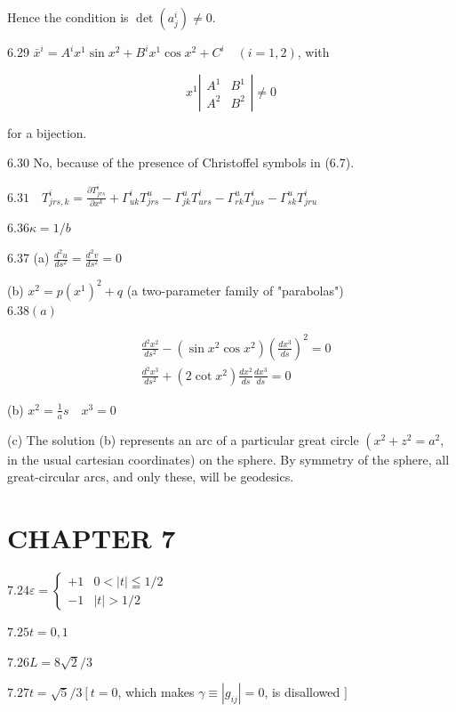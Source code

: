 \documentclass[10pt]{article}
\begin{document}
Hence the condition is $\operatorname{det}\left(a_{j}^{i}\right) \neq 0$.

6.29 $\bar{x}^{i}=A^{i} x^{1} \sin x^{2}+B^{i} x^{1} \cos x^{2}+C^{i} \quad(i=1,2)$, with

$$
x^{1}\left|\begin{array}{ll}
A^{1} & B^{1} \\
A^{2} & B^{2}
\end{array}\right| \neq 0
$$

for a bijection.

6.30 No, because of the presence of Christoffel symbols in (6.7).

$6.31 \quad T_{j r s, k}^{i}=\frac{\partial T_{j r s}^{i}}{\partial x^{k}}+\Gamma_{u k}^{i} T_{j r s}^{u}-\Gamma_{j k}^{u} T_{u r s}^{i}-\Gamma_{r k}^{u} T_{j u s}^{i}-\Gamma_{s k}^{u} T_{j r u}^{i}$

$6.36 \kappa=1 / b$

6.37 (a) $\frac{d^{2} u}{d s^{2}}=\frac{d^{2} v}{d s^{2}}=0$

(b) $x^{2}=p\left(x^{1}\right)^{2}+q$ (a two-parameter family of "parabolas")\\
$6.38(a)$

$$
\begin{aligned}
& \frac{d^{2} x^{2}}{d s^{2}}-\left(\sin x^{2} \cos x^{2}\right)\left(\frac{d x^{3}}{d s}\right)^{2}=0 \\
& \frac{d^{2} x^{3}}{d s^{2}}+\left(2 \cot x^{2}\right) \frac{d x^{2}}{d s} \frac{d x^{3}}{d s}=0
\end{aligned}
$$

(b) $x^{2}=\frac{1}{a} s \quad x^{3}=0$

(c) The solution (b) represents an arc of a particular great circle $\left(x^{2}+z^{2}=a^{2}\right.$, in the usual cartesian coordinates) on the sphere. By symmetry of the sphere, all great-circular arcs, and only these, will be geodesics.

\section*{CHAPTER 7}
$7.24 \varepsilon= \begin{cases}+1 & 0<|t| \leqq 1 / 2 \\ -1 & |t|>1 / 2\end{cases}$

$7.25 t=0,1$

$7.26 L=8 \sqrt{2} / 3$

$7.27 t=\sqrt{5} / 3\left[t=0\right.$, which makes $\gamma \equiv\left|g_{i j}\right|=0$, is disallowed $]$
\end{document}
